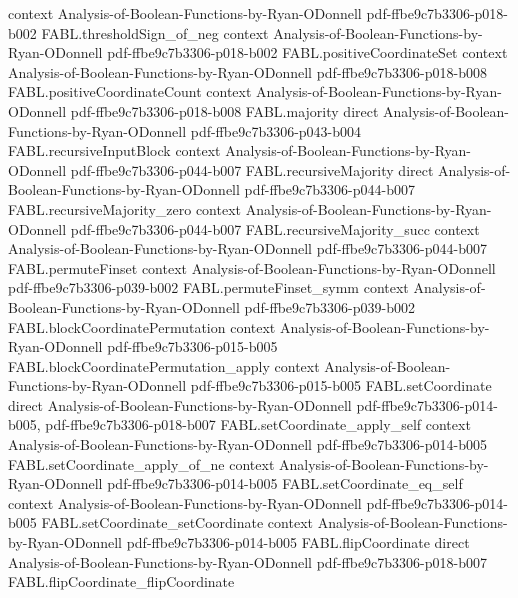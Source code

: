 \begin{theorem}
  {context}
  {Analysis-of-Boolean-Functions-by-Ryan-ODonnell}
  {pdf-ffbe9c7b3306-p018-b002}
\proofstep
  {FABL.thresholdSign_of_neg}
  {context}
  {Analysis-of-Boolean-Functions-by-Ryan-ODonnell}
  {pdf-ffbe9c7b3306-p018-b002}
\proofstep
  {FABL.positiveCoordinateSet}
  {context}
  {Analysis-of-Boolean-Functions-by-Ryan-ODonnell}
  {pdf-ffbe9c7b3306-p018-b008}
\proofstep
  {FABL.positiveCoordinateCount}
  {context}
  {Analysis-of-Boolean-Functions-by-Ryan-ODonnell}
  {pdf-ffbe9c7b3306-p018-b008}
\proofstep
  {FABL.majority}
  {direct}
  {Analysis-of-Boolean-Functions-by-Ryan-ODonnell}
  {pdf-ffbe9c7b3306-p043-b004}
\proofstep
  {FABL.recursiveInputBlock}
  {context}
  {Analysis-of-Boolean-Functions-by-Ryan-ODonnell}
  {pdf-ffbe9c7b3306-p044-b007}
\proofstep
  {FABL.recursiveMajority}
  {direct}
  {Analysis-of-Boolean-Functions-by-Ryan-ODonnell}
  {pdf-ffbe9c7b3306-p044-b007}
\proofstep
  {FABL.recursiveMajority_zero}
  {context}
  {Analysis-of-Boolean-Functions-by-Ryan-ODonnell}
  {pdf-ffbe9c7b3306-p044-b007}
\proofstep
  {FABL.recursiveMajority_succ}
  {context}
  {Analysis-of-Boolean-Functions-by-Ryan-ODonnell}
  {pdf-ffbe9c7b3306-p044-b007}
\proofstep
  {FABL.permuteFinset}
  {context}
  {Analysis-of-Boolean-Functions-by-Ryan-ODonnell}
  {pdf-ffbe9c7b3306-p039-b002}
\proofstep
  {FABL.permuteFinset_symm}
  {context}
  {Analysis-of-Boolean-Functions-by-Ryan-ODonnell}
  {pdf-ffbe9c7b3306-p039-b002}
\proofstep
  {FABL.blockCoordinatePermutation}
  {context}
  {Analysis-of-Boolean-Functions-by-Ryan-ODonnell}
  {pdf-ffbe9c7b3306-p015-b005}
\proofstep
  {FABL.blockCoordinatePermutation_apply}
  {context}
  {Analysis-of-Boolean-Functions-by-Ryan-ODonnell}
  {pdf-ffbe9c7b3306-p015-b005}
\proofstep
  {FABL.setCoordinate}
  {direct}
  {Analysis-of-Boolean-Functions-by-Ryan-ODonnell}
  {pdf-ffbe9c7b3306-p014-b005,
    pdf-ffbe9c7b3306-p018-b007}
\proofstep
  {FABL.setCoordinate_apply_self}
  {context}
  {Analysis-of-Boolean-Functions-by-Ryan-ODonnell}
  {pdf-ffbe9c7b3306-p014-b005}
\proofstep
  {FABL.setCoordinate_apply_of_ne}
  {context}
  {Analysis-of-Boolean-Functions-by-Ryan-ODonnell}
  {pdf-ffbe9c7b3306-p014-b005}
\proofstep
  {FABL.setCoordinate_eq_self}
  {context}
  {Analysis-of-Boolean-Functions-by-Ryan-ODonnell}
  {pdf-ffbe9c7b3306-p014-b005}
\proofstep
  {FABL.setCoordinate_setCoordinate}
  {context}
  {Analysis-of-Boolean-Functions-by-Ryan-ODonnell}
  {pdf-ffbe9c7b3306-p014-b005}
\proofstep
  {FABL.flipCoordinate}
  {direct}
  {Analysis-of-Boolean-Functions-by-Ryan-ODonnell}
  {pdf-ffbe9c7b3306-p018-b007}
\proofstep
  {FABL.flipCoordinate_flipCoordinate}

\end{theorem}
